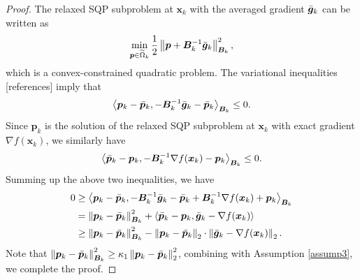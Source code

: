 \documentclass[aos]{imsart}
\numberwithin{equation}{section}
\theoremstyle{plain}
\begin{document}
\begin{appendix}
\begin{proof}
    The relaxed SQP subproblem at $\bm{x}_k$ with the averaged gradient $\Bar{\bm{g}}_{k}$ can be written as 
    \begin{equation*}
        \min_{\bm{p} \in \widetilde{\Omega}_k} \frac{1}{2}\left\| \bm{p} + \bm{B}_k^{-1} \Bar{\bm{g}}_{k} \right\|_{\bm{B}_k}^2,
    \end{equation*}
    which is a convex-constrained quadratic problem. The variational inequalities [references] imply that 
    \begin{equation*}
        \left \langle \bm{p}_k - \Bar{\bm{p}}_k, - \bm{B}_k^{-1} \Bar{\bm{g}}_{k} - \Bar{\bm{p}}_k \right \rangle_{\bm{B}_k} \leq 0.
    \end{equation*}
    Since $\bm{p}_k$ is the solution of the relaxed SQP subproblem at $\bm{x}_k$ with exact gradient $\nabla f(\bm{x}_k)$, we similarly have 
    \begin{equation*}
        \left \langle  \Bar{\bm{p}}_k - \bm{p}_k, - \bm{B}_k^{-1} \nabla f(\bm{x}_k) - \bm{p}_k \right \rangle_{\bm{B}_k} \leq 0.
    \end{equation*}
    Summing up the above two inequalities, we have 
    \begin{equation}
    \begin{split}
        0 & \geq \left \langle \bm{p}_k - \Bar{\bm{p}}_k, - \bm{B}_k^{-1} \Bar{\bm{g}}_{k} - \Bar{\bm{p}}_k + \bm{B}_k^{-1} \nabla f(\bm{x}_k) + \bm{p}_k\right \rangle_{\bm{B}_k} \\
        & = \left \|  \bm{p}_k - \Bar{\bm{p}}_k \right \|_{\bm{B}_k}^2 + \left \langle  \Bar{\bm{p}}_k - \bm{p}_k, \Bar{\bm{g}}_{k} - \nabla f(\bm{x}_k)  \right \rangle\\
        & \geq \left \|  \bm{p}_k - \Bar{\bm{p}}_k \right \|_{\bm{B}_k}^2 - \left\|  \bm{p}_k - \Bar{\bm{p}}_k\right\|_2 \cdot \left\| \Bar{\bm{g}}_{k} - \nabla f(\bm{x}_k) \right\|_2.
    \end{split}
    \end{equation}
    Note that $\left \|  \bm{p}_k - \Bar{\bm{p}}_k \right \|_{\bm{B}_k}^2 \geq \kappa_1 \left \|  \bm{p}_k - \Bar{\bm{p}}_k \right \|_2^2$, combining with Assumption \ref{assump3}, we complete the proof. 
\end{proof}



\end{appendix}
\end{document}
